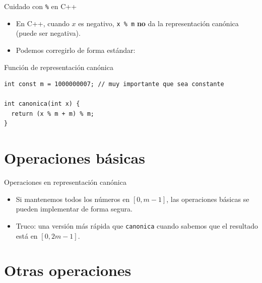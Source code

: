 \documentclass[aspectratio=169]{beamer}
\begin{document}
\begin{frame}[fragile]{Cuidado con \texttt{\%} en C++}
  \begin{itemize}
    \item En C++, cuando \(x\) es negativo, \texttt{x \% m} \textbf{no} da la representación canónica (puede ser negativa).
    \item Podemos corregirlo de forma estándar:
  \end{itemize}
  \begin{block}{Función de representación canónica}
  \begin{lstlisting}[style=customc]
int const m = 1000000007; // muy importante que sea constante

int canonica(int x) {
  return (x % m + m) % m;
}
  \end{lstlisting}
  \end{block}
\end{frame}

\section{Operaciones básicas}

\begin{frame}[fragile]{Operaciones en representación canónica}
  \begin{itemize}
    \item Si mantenemos todos los números en \([0, m-1]\), las operaciones básicas se pueden implementar de forma segura.
    \item Truco: una versión más rápida que \texttt{canonica} cuando sabemos que el resultado está en \([0, 2m-1]\).
  \end{itemize}
\end{frame}

\section{Otras operaciones}
\end{document}
